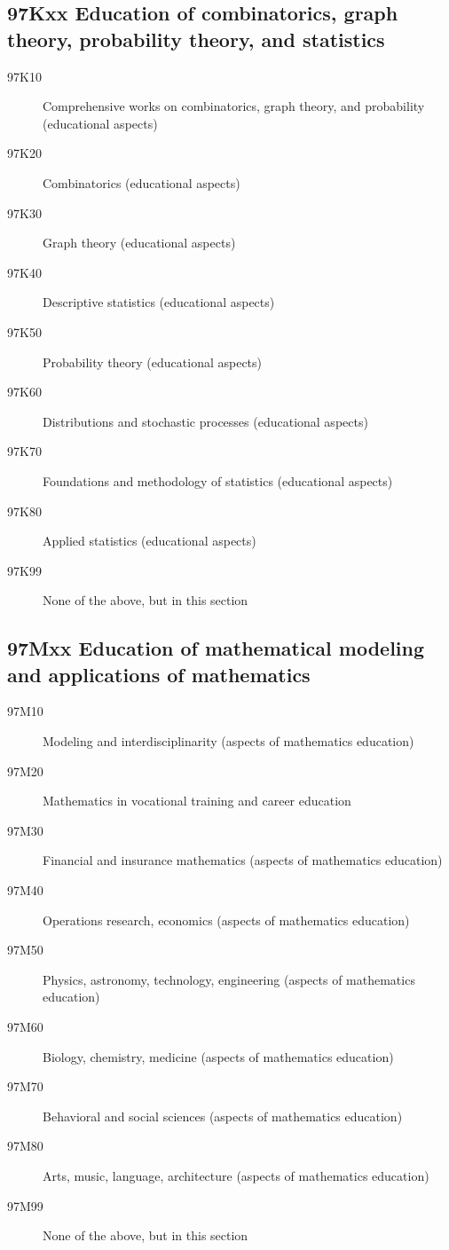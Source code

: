 \subsection*{97Kxx  Education of combinatorics, graph theory, probability theory, and statistics }\label{97Kxx}
\begin{description}  
\item [97K10]\label{97K10} Comprehensive works on combinatorics, graph theory, and probability (educational aspects)
\item [97K20]\label{97K20} Combinatorics (educational aspects)
\item [97K30]\label{97K30} Graph theory (educational aspects)
\item [97K40]\label{97K40} Descriptive statistics (educational aspects)
\item [97K50]\label{97K50} Probability theory (educational aspects)
\item [97K60]\label{97K60} Distributions and stochastic processes (educational aspects)
\item [97K70]\label{97K70} Foundations and methodology of statistics (educational aspects)
\item [97K80]\label{97K80} Applied statistics (educational aspects)
\item [97K99]\label{97K99} None of the above, but in this section
\end{description}
\subsection*{97Mxx  Education of mathematical modeling and applications of mathematics }\label{97Mxx}
\begin{description}  
\item [97M10]\label{97M10} Modeling and interdisciplinarity (aspects of mathematics education)
\item [97M20]\label{97M20} Mathematics in vocational training and career education
\item [97M30]\label{97M30} Financial and insurance mathematics (aspects of mathematics education)
\item [97M40]\label{97M40} Operations research, economics (aspects of mathematics education)
\item [97M50]\label{97M50} Physics, astronomy, technology, engineering (aspects of mathematics education)
\item [97M60]\label{97M60} Biology, chemistry, medicine (aspects of mathematics education)
\item [97M70]\label{97M70} Behavioral and social sciences (aspects of mathematics education)
\item [97M80]\label{97M80} Arts, music, language, architecture (aspects of mathematics education)
\item [97M99]\label{97M99} None of the above, but in this section
\end{description}
